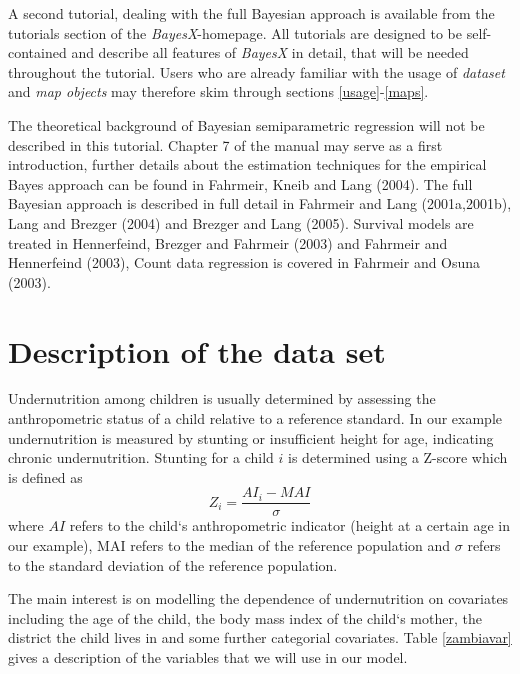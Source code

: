 \documentclass{article}
\begin{document}
A second tutorial, dealing with the full Bayesian approach is
available from the tutorials section of the {\it BayesX}-homepage.
All tutorials are designed to be self-contained and describe all
features of {\it BayesX} in detail, that will be needed throughout
the tutorial. Users who are already familiar with the usage of
{\it dataset} and {\it map objects} may therefore skim through
sections \ref{usage}-\ref{maps}.

The theoretical background of Bayesian semiparametric regression
will not be described in this tutorial. Chapter 7 of the manual may
serve as a first introduction, further details about the estimation
techniques for the empirical Bayes approach can be found in
Fahrmeir, Kneib and Lang (2004).\nocite{fahkne04} The full Bayesian
approach is described in full detail in Fahrmeir and Lang
(2001a,2001b),\nocite{fahlan01a} \nocite{fahlan01b} Lang and Brezger
(2004) and Brezger and Lang (2005).\nocite{lanbre04} Survival models
are treated in Hennerfeind, Brezger and Fahrmeir
(2003)\nocite{henfah03} and Fahrmeir and Hennerfeind
(2003)\nocite{fahhen03}, Count data regression is covered in
Fahrmeir and Osuna (2003)\nocite{fahosu03}.

\section{Description of the data set}

Undernutrition among children is usually determined by assessing
the anthropometric status of a child relative to a reference
standard. In our example undernutrition is measured by stunting or
insufficient height for age, indicating chronic undernutrition.
Stunting for a child $i$ is determined using a Z-score which is
defined as
\[Z_i = \frac{AI_i-MAI}{\sigma}\]
where $AI$ refers to the child`s anthropometric indicator (height
at a certain age in our example), MAI refers to the median of the
reference population and $\sigma$ refers to the standard deviation
of the reference population.

The main interest is on modelling the dependence of undernutrition
on covariates including the age of the child, the body mass index
of the child`s mother, the district the child lives in and some
further categorial covariates. Table \ref{zambiavar} gives a
description of the variables that we will use in our model.
\end{document}
